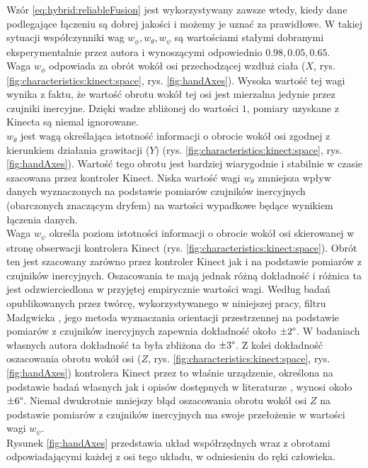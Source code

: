 Wzór \eqref{eq:hybrid:reliableFusion} jest wykorzystywany zawsze wtedy, kiedy dane podlegające łączeniu są dobrej jakości i możemy je uznać za prawidłowe. W takiej sytuacji współczynniki wag $w_\phi , w_\theta , w_\psi$ są wartościami stałymi dobranymi eksperymentalnie przez autora i wynoszącymi odpowiednio $0.98,0.05,0.65$.\\
Waga $w_\phi$ odpowiada za obrót wokół osi przechodzącej wzdłuż ciała ($X$, rys. \ref{fig:characteristics:kinect:space}, rys. \ref{fig:handAxes}).
Wysoka wartość tej wagi wynika z faktu, że wartość obrotu wokół tej osi jest mierzalna jedynie przez czujniki inercyjne. Dzięki wadze zbliżonej do wartości $1$, pomiary uzyskane z Kinecta są niemal ignorowane.\\
$w_\theta$ jest wagą określająca istotność informacji o obrocie wokół osi zgodnej z kierunkiem działania grawitacji ($Y$) (rys. \ref{fig:characteristics:kinect:space}, rys. \ref{fig:handAxes}). Wartość tego obrotu jest bardziej wiarygodnie i stabilnie w czasie szacowana przez kontroler Kinect. Niska wartość wagi $w_\theta$ zmniejsza wpływ danych wyznaczonych na podstawie pomiarów czujników inercyjnych (obarczonych znaczącym dryfem) na wartości wypadkowe będące wynikiem łączenia danych.\\ 
Waga $w_\psi$ określa poziom istotności informacji o obrocie wokół osi skierowanej w stronę obserwacji kontrolera Kinect (rys. \ref{fig:characteristics:kinect:space}). Obrót ten jest szacowany zarówno przez kontroler Kinect jak i na podstawie pomiarów z czujników inercyjnych. Oszacowania te mają jednak różną dokładność i różnica ta jest odzwierciedlona w przyjętej empirycznie wartości wagi. Według badań opublikowanych przez twórcę, wykorzystywanego w niniejszej pracy, filtru Madgwicka \cite{Madgwick2010}, jego metoda wyznaczania orientacji przestrzennej na podstawie pomiarów z czujników inercyjnych zapewnia dokładność około $\pm2\degree$. W badaniach własnych autora dokładność ta była zbliżona do $\pm3\degree$. Z kolei dokładność oszacowania obrotu wokół osi ($Z$,  rys. \ref{fig:characteristics:kinect:space}, rys. \ref{fig:handAxes}) 
kontrolera Kinect przez to właśnie urządzenie, określona na podstawie badań własnych jak i opisów dostępnych w literaturze \cite{Huber2015}, wynosi około $\pm6\degree$. Niemal dwukrotnie mniejszy błąd 
oszacowania obrotu wokół osi $Z$ 
na podstawie pomiarów z czujników inercyjnych ma swoje przełożenie w wartości wagi $w_\psi$.\\
Rysunek \ref{fig:handAxes} przedstawia układ współrzędnych wraz z obrotami odpowiadającymi każdej z osi tego układu, w odniesieniu do ręki człowieka.


